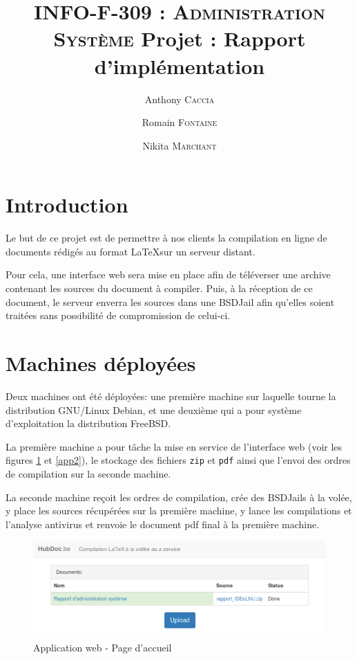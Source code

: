 \documentclass[10pt,a4paper]{article}
\author{Anthony \textsc{Caccia} \and Romain \textsc{Fontaine} \and Nikita \textsc{Marchant} }
\date{}
\title{\textsc{INFO-F-309 : Administration Système} Projet : Rapport d'implémentation}
\begin{document}
\maketitle

\tableofcontents
\newpage

\section{Introduction}
\label{sec:Introduction}

Le but de ce projet est de permettre à nos clients la compilation en ligne de documents rédigés au format \LaTeX sur un serveur distant.

Pour cela, une interface web sera mise en place afin de téléverser une archive contenant les sources du document à compiler.
Puis, à la réception de ce document, le serveur enverra les sources dans une BSDJail afin qu'elles soient traitées sans possibilité de compromission de celui-ci.

\section{Machines déployées}
\label{sec:Machines déployées}

Deux machines ont été déployées: une première machine sur laquelle tourne la distribution GNU/Linux Debian, et une deuxième qui a pour système d'exploitation la distribution FreeBSD.

La première machine a pour tâche la mise en service de l'interface web
(voir les figures \ref{app1} et \ref{app2}),
le stockage des fichiers \texttt{zip} et \texttt{pdf}
ainsi que l'envoi des ordres de compilation sur la seconde machine.

La seconde machine reçoit les ordres de compilation, crée des BSDJails à la volée, y place les sources récupérées sur la première machine,
y lance les compilations et l'analyse antivirus et renvoie le document pdf final à la première machine.

\begin{figure}[h]
   \centering
   \includegraphics[scale=0.4]{hubdoc.png}
   \caption{\label{app1} Application web - Page d'accueil}
\end{figure}
\end{document}

